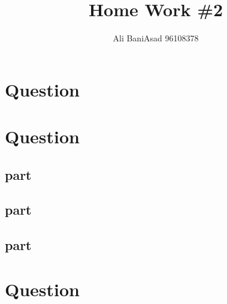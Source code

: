 \documentclass{article}
\title{Home Work \#2}
\author{Ali BaniAsad 96108378}
\begin{document}
	\maketitle

	\section{Question}
	
	\section{Question}
	\subsection{part}
	
	\subsection{part}
	
	\subsection{part}
	
	\newpage
	\section{Question}
	
	\newpage
	\tableofcontents
\end{document}
